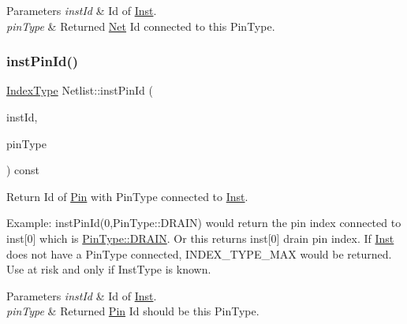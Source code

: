 \begin{DoxyParams}{Parameters}
{\em inst\+Id} & Id of \hyperlink{classInst}{Inst}. \\
\hline
{\em pin\+Type} & Returned \hyperlink{classNet}{Net} Id connected to this Pin\+Type. \\
\hline
\end{DoxyParams}
\mbox{\label{classNetlist_a981030068cfb1eb1ce360ee6c943513a}} 
\subsubsection{\texorpdfstring{inst\+Pin\+Id()}{instPinId()}}
{\footnotesize\ttfamily \hyperlink{type_8h_a581e8093e28e7362f2b6937296190676}{Index\+Type} Netlist\+::inst\+Pin\+Id (\begin{DoxyParamCaption}\item[{\hyperlink{type_8h_a581e8093e28e7362f2b6937296190676}{Index\+Type}}]{inst\+Id,  }\item[{\hyperlink{type_8h_afaab50027002ecbb6c8ac27e727d1bb4}{Pin\+Type}}]{pin\+Type }\end{DoxyParamCaption}) const}



Return Id of \hyperlink{classPin}{Pin} with Pin\+Type connected to \hyperlink{classInst}{Inst}. 

Example\+: inst\+Pin\+Id(0,\+Pin\+Type\+::\+D\+R\+A\+I\+N) would return the pin index connected to inst\mbox{[}0\mbox{]} which is \hyperlink{type_8h_afaab50027002ecbb6c8ac27e727d1bb4ad22e8f7ce637479aeffe9dab9ee7337d}{Pin\+Type\+::\+D\+R\+A\+IN}. Or this returns inst\mbox{[}0\mbox{]} drain pin index. If \hyperlink{classInst}{Inst} does not have a Pin\+Type connected, I\+N\+D\+E\+X\+\_\+\+T\+Y\+P\+E\+\_\+\+M\+AX would be returned. Use at risk and only if Inst\+Type is known.


\begin{DoxyParams}{Parameters}
{\em inst\+Id} & Id of \hyperlink{classInst}{Inst}. \\
\hline
{\em pin\+Type} & Returned \hyperlink{classPin}{Pin} Id should be this Pin\+Type. \\
\hline
\end{DoxyParams}
\mbox{\label{classNetlist_a3ea34258d9e7f6793736dcac5b927eb6}} 
